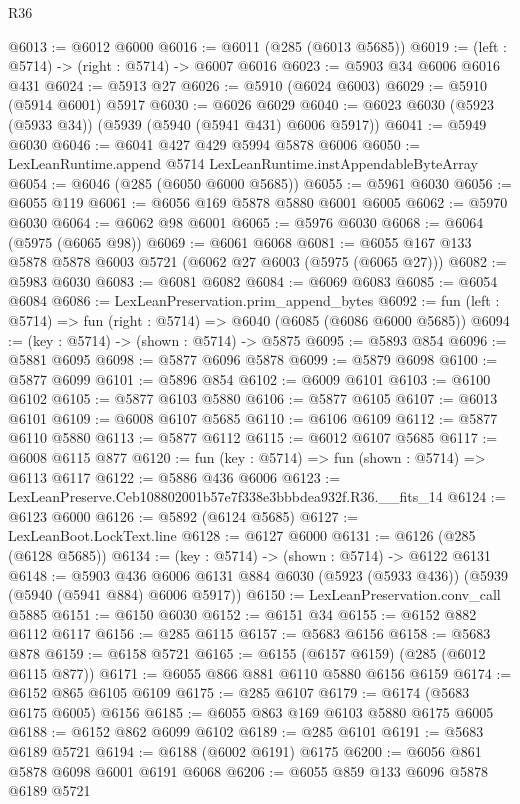 \begin{lexlean}{R36}
\begin{coremodule}
@6013 := @6012 @6000
@6016 := @6011 (@285 (@6013 @5685))
@6019 := (left : @5714) -> (right : @5714) -> @6007 @6016
@6023 := @5903 @34 @6006 @6016 @431
@6024 := @5913 @27
@6026 := @5910 (@6024 @6003)
@6029 := @5910 (@5914 @6001) @5917
@6030 := @6026 @6029
@6040 := @6023 @6030 (@5923 (@5933 @34)) (@5939 (@5940 (@5941 @431) @6006 @5917))
@6041 := @5949 @6030
@6046 := @6041 @427 @429 @5994 @5878 @6006
@6050 := LexLeanRuntime.append @5714 LexLeanRuntime.instAppendableByteArray
@6054 := @6046 (@285 (@6050 @6000 @5685))
@6055 := @5961 @6030
@6056 := @6055 @119
@6061 := @6056 @169 @5878 @5880 @6001 @6005
@6062 := @5970 @6030
@6064 := @6062 @98 @6001
@6065 := @5976 @6030
@6068 := @6064 (@5975 (@6065 @98))
@6069 := @6061 @6068
@6081 := @6055 @167 @133 @5878 @5878 @6003 @5721 (@6062 @27 @6003 (@5975 (@6065 @27)))
@6082 := @5983 @6030
@6083 := @6081 @6082
@6084 := @6069 @6083
@6085 := @6054 @6084
@6086 := LexLeanPreservation.prim_append_bytes
@6092 := fun (left : @5714) => fun (right : @5714) => @6040 (@6085 (@6086 @6000 @5685))
@6094 := (key : @5714) -> (shown : @5714) -> @5875
@6095 := @5893 @854
@6096 := @5881 @6095
@6098 := @5877 @6096 @5878
@6099 := @5879 @6098
@6100 := @5877 @6099
@6101 := @5896 @854
@6102 := @6009 @6101
@6103 := @6100 @6102
@6105 := @5877 @6103 @5880
@6106 := @5877 @6105
@6107 := @6013 @6101
@6109 := @6008 @6107 @5685
@6110 := @6106 @6109
@6112 := @5877 @6110 @5880
@6113 := @5877 @6112
@6115 := @6012 @6107 @5685
@6117 := @6008 @6115 @877
@6120 := fun (key : @5714) => fun (shown : @5714) => @6113 @6117
@6122 := @5886 @436 @6006
@6123 := LexLeanPreserve.Ceb108802001b57e7f338e3bbbdea932f.R36.__fits_14
@6124 := @6123 @6000
@6126 := @5892 (@6124 @5685)
@6127 := LexLeanBoot.LockText.line
@6128 := @6127 @6000
@6131 := @6126 (@285 (@6128 @5685))
@6134 := (key : @5714) -> (shown : @5714) -> @6122 @6131
@6148 := @5903
    @436
    @6006
    @6131
    @884
    @6030
    (@5923 (@5933 @436))
    (@5939 (@5940 (@5941 @884) @6006 @5917))
@6150 := LexLeanPreservation.conv_call @5885
@6151 := @6150 @6030
@6152 := @6151 @34
@6155 := @6152 @882 @6112 @6117
@6156 := @285 @6115
@6157 := @5683 @6156
@6158 := @5683 @878
@6159 := @6158 @5721
@6165 := @6155 (@6157 @6159) (@285 (@6012 @6115 @877))
@6171 := @6055 @866 @881 @6110 @5880 @6156 @6159
@6174 := @6152 @865 @6105 @6109
@6175 := @285 @6107
@6179 := @6174 (@5683 @6175 @6005) @6156
@6185 := @6055 @863 @169 @6103 @5880 @6175 @6005
@6188 := @6152 @862 @6099 @6102
@6189 := @285 @6101
@6191 := @5683 @6189 @5721
@6194 := @6188 (@6002 @6191) @6175
@6200 := @6056 @861 @5878 @6098 @6001 @6191 @6068
@6206 := @6055 @859 @133 @6096 @5878 @6189 @5721

\end{coremodule}
\end{lexlean}
